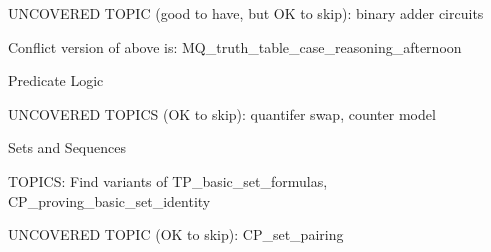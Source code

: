 \documentclass[quiz]{mcs}
\begin{document}
UNCOVERED TOPIC (good to have, but OK to skip): binary adder circuits



Conflict version of above is: MQ\_truth\_table\_case\_reasoning\_afternoon

\examspace

\begin{center}
{\large Predicate Logic}
\end{center}

UNCOVERED TOPICS (OK to skip): quantifer swap, counter model




\begin{center}
{\large Sets and Sequences}
\end{center}

TOPICS: Find variants of TP\_basic\_set\_formulas,
CP\_proving\_basic\_set\_identity

UNCOVERED TOPIC (OK to skip): CP\_set\_pairing

\end{document}
